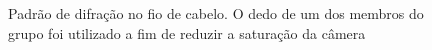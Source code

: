 \begin{figure}[H]
    \centering

    

    \caption{Padrão de difração no fio de cabelo. O dedo de um dos membros do grupo foi utilizado a fim de reduzir a saturação da câmera}
    \label{fig:cabelo}
\end{figure}